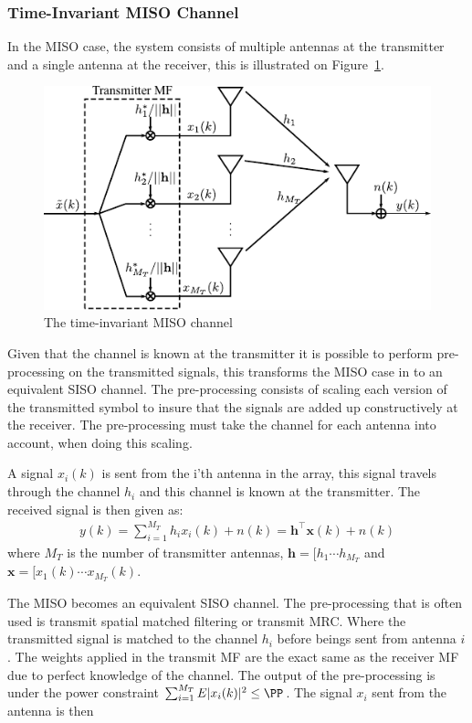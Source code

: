 \subsubsection{Time-Invariant MISO Channel}
In the MISO case, the system consists of multiple antennas at the transmitter and a single antenna at the receiver, this is illustrated on Figure~\ref{fig:misoModel}.
\begin{figure}[htbp]
  \centering
  \includegraphics[scale=1.2]{img/analysis/misoModel}
  \caption{The time-invariant MISO channel}
  \label{fig:misoModel}
\end{figure}
Given that the channel is known at the transmitter it is possible to perform pre-processing on the transmitted signals, this transforms the MISO case in to an equivalent SISO channel. The pre-processing consists of scaling each version of the transmitted symbol to insure that the signals are added up constructively at the receiver. The pre-processing must take the channel for each antenna into account, when doing this scaling. 

A signal $x_i(k)$ is sent from the i'th antenna in the array, this signal travels through the channel $h_i$ and this channel is known at the transmitter. The received signal is then given as\cite{Tim2012Practical}: 
\begin{align*}
  y(k) = \sum_{i=1}^{M_T} h_ix_i(k) + n(k) = \mathbf{h}^\intercal \mathbf{x}(k) + n(k)
\end{align*}
where $M_T$ is the number of transmitter antennas, $\mathbf{h} = [h_1 \cdots h_{M_T}$ and $\mathbf{x} = [x_1(k) \cdots x_{M_T}(k)$. 



The MISO becomes an equivalent SISO channel. The pre-processing that is often used is transmit spatial matched filtering or transmit MRC. Where the transmitted signal is matched to the channel $h_i$ before beings sent from antenna $i$. The weights applied in the transmit MF are the exact same as the receiver MF due to perfect knowledge of the channel\cite{Tim2012Practical}. The output of the pre-processing is under the power constraint $\sum_{i=1}^{M_T} E|x_i(k)|^2 \leq \PP$. The signal $x_i$ sent from the antenna is then 

